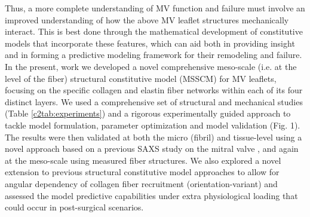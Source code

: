     
    Thus, a more complete understanding of MV function and failure must involve an improved understanding of how the above MV leaflet structures mechanically interact. This is best done through the mathematical development of constitutive models that incorporate these features, which can aid both in providing insight and in forming a predictive modeling framework for their remodeling and failure. In the present, work we developed a novel comprehensive meso-scale (i.e. at the level of the fiber) structural constitutive model (MSSCM) for MV leaflets, focusing on the specific collagen and elastin fiber networks within each of its four distinct layers. We used a comprehensive set of structural and mechanical studies (Table \ref{c2tab:experiments}) and a rigorous experimentally guided approach to tackle model formulation, parameter optimization and model validation (Fig. 1). The results were then validated at both the micro (fibril) and tissue-level using a novel approach based on a previous SAXS study on the mitral valve \cite{liao_relation_2007}, and again at the meso-scale using measured fiber structures. We also explored a novel extension to previous structural constitutive model approaches \cite{hollander_constitutive_2011,chen_micromechanics_2011,fata_insights_2014,sacks_incorporation_2003} to allow for angular dependency of collagen fiber recruitment (orientation-variant) and assessed the model predictive capabilities under extra physiological loading that could occur in post-surgical scenarios.
    
